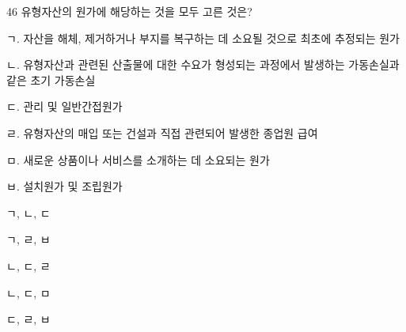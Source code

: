 \begin{question}{46}
유형자산의 원가에 해당하는 것을 모두 고른 것은?
\begin{framedtext}
ㄱ. 자산을 해체, 제거하거나 부지를 복구하는 데 소요될 것으로 최초에 추정되는 원가 \par
ㄴ. 유형자산과 관련된 산출물에 대한 수요가 형성되는 과정에서 발생하는 가동손실과 같은 초기 가동손실 \par
ㄷ. 관리 및 일반간접원가 \par
ㄹ. 유형자산의 매입 또는 건설과 직접 관련되어 발생한 종업원 급여 \par
ㅁ. 새로운 상품이나 서비스를 소개하는 데 소요되는 원가 \par
ㅂ. 설치원가 및 조립원가 \par
\end{framedtext}
\begin{choices}
  \item ㄱ, ㄴ, ㄷ
  \item ㄱ, ㄹ, ㅂ
  \item ㄴ, ㄷ, ㄹ
  \item ㄴ, ㄷ, ㅁ
  \item ㄷ, ㄹ, ㅂ
\end{choices}
\end{question}
